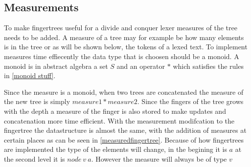 \subsection{Measurements}
To make fingertrees useful for a divide and conquer lexer measures of the tree
needs to be added. A measure of a tree may for example be how many elements is
in the tree or as will be shown below, the tokens of a lexed text. To implement
measures time effiecently the data type that is choosen should be a monoid. A
monoid is in abstract algebra a set $S$ and an operator $*$ which satisfies the
rules in \cref{monoid stuff}.

Since the measure is a monoid, when two trees are concatenated the measure of 
the new tree is simply $measure1 * measure2$. Since the fingers of the tree
grows with the depth a measure of the finger is also stored to make updates and
concatenation more time efficient. With the measurement modifcation to the
fingertree the datastructure is almost the same, with the addition of measures
at certain places as can be seen in \cref{measuredfingertree}. Because of how
fingertrees are implemented the type of the elements will change, in the
begining it is $a$ at the second level it is $node ~ v ~ a$. However the measure
will always be of type $v$

